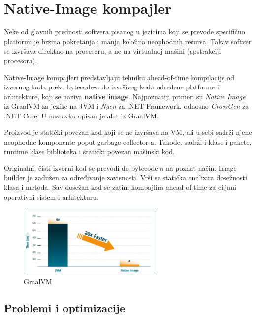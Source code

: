 \documentclass[a4paper]{article}
\begin{document}
\section{Native-Image kompajler}
\label{sec:natImg}

Neke od glavnih prednosti softvera pisanog u jezicima koji se prevode specifično platformi je
brzina pokretanja i manja količina neophodnih resursa. Takav softver se izvršava direktno na
procesoru, a ne na virtualnoj mašini (apstrakciji procesora).

Native-Image kompajleri predstavljaju tehniku ahead-of-time kompilacije od izvornog koda preko
bytecode-a do izvršivog koda određene platforme i arhitekture, koji se 
naziva \textbf{native image}. \cite{natImgGraal01}
Najpoznatiji primeri su \textit{Native Image} iz GraalVM za jezike na JVM i
\textit{Ngen} za .NET Framework, odnosno \textit{CrossGen} za .NET Core.
U nastavku opisan je alat iz GraalVM.

Proizvod je statički povezan kod koji se ne izvršava na VM, ali u sebi sadrži njene neophodne 
komponente poput garbage collector-a. Takođe, sadrži i klase i pakete,
runtime klase biblioteka i statički povezan mašinski kod. \cite{natImgGraal02}

Originalni, čisti izvorni kod se prevodi do bytecode-a na poznat način.
Image builder je zadužen za određivanje zavisnosti. Vrši se statička
analizira dosežnosti klasa i metoda. Sav dosežan kod se zatim 
kompajlira ahead-of-time za ciljani operativni sistem i arhitekturu.

\begin{figure}[h!]
  \begin{center}
      \includegraphics[width=70mm]{./pics/alibaba_pic.jpg}
  \end{center}
  \caption {GraalVM}
  \label{fig:natImg-alibaba}
\end{figure}

\subsection{Problemi i optimizacije}
\label{sec:natImg-proboptim}
\end{document}
